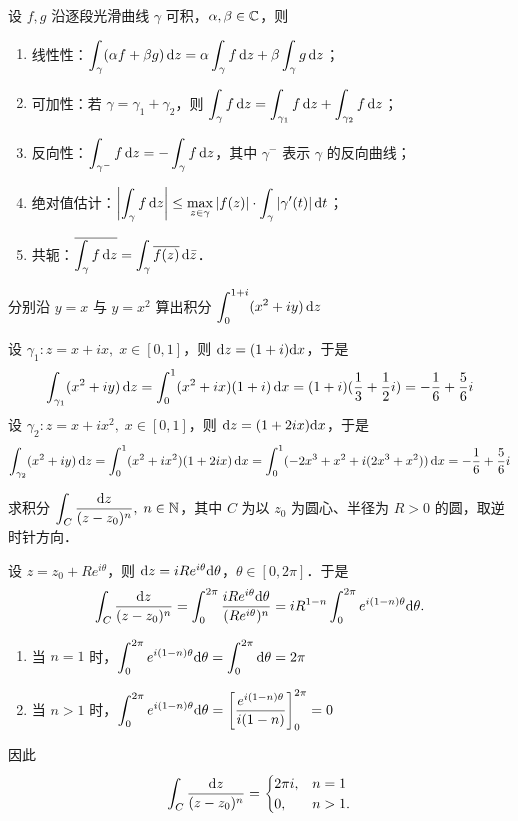 \documentclass[12pt, a4paper, oneside, UTF8]{ctexbook}
\begin{document}
\begin{theorem}[积分基本性质]
设 $f,g$ 沿逐段光滑曲线 $\gamma$ 可积，$\alpha,\beta\in\mathbb{C}$，则
\begin{enumerate}
    \item 线性性：$\displaystyle\int_\gamma (\alpha f + \beta g)\,\mathrm{d} z = \alpha\int_\gamma f\,\mathrm{d} z + \beta\int_\gamma g\,\mathrm{d} z$；
    \item 可加性：若 $\gamma=\gamma_1+\gamma_2$，则 $\displaystyle\int_\gamma f\,\mathrm{d} z = \int_{\gamma_1}f\,\mathrm{d} z + \int_{\gamma_2}f\,\mathrm{d} z$；
    \item 反向性：$\displaystyle\int_{\gamma^-} f\,\mathrm{d} z = -\int_\gamma f\,\mathrm{d} z$，其中 $\gamma^-$ 表示 $\gamma$ 的反向曲线；
    \item 绝对值估计：$\displaystyle\abs{\int_\gamma f\,\mathrm{d} z} \le \max_{z\in\gamma}\abs{f(z)}\cdot \int_{\gamma} \abs{\gamma'(t)}\,\mathrm{d} t$；
    \item 共轭：$\displaystyle\overline{\int_\gamma f\,\mathrm{d} z} = \int_\gamma \overline{f(z)}\,\mathrm{d}\bar z$．
\end{enumerate}
\end{theorem}
\begin{example}
    分别沿 $y=x$ 与 $y=x^2$ 算出积分 $\displaystyle\int_0^{1+i}(x^2+iy)\,\mathrm{d} z$
\end{example}
\begin{solution}
    
    设 $\gamma_1\colon z=x+ix,\;x\in[0,1]$，则 $\mathrm{d} z = (1+i)\mathrm{d} x$，于是
    \[
    \int_{\gamma_1}(x^2+iy)\,\mathrm{d} z = \int_0^1(x^2+ix)(1+i)\,\mathrm{d} x = (1+i)(\frac{1}{3}+\frac{1}{2}i) = -\frac{1}{6}+\frac{5}{6}i
    \]
    设 $\gamma_2\colon z=x+ix^2,\;x\in[0,1]$，则 $\mathrm{d} z = (1+2ix)\mathrm{d} x$，于是
    \[
    \int_{\gamma_2}(x^2+iy)\,\mathrm{d} z = \int_0^1(x^2+ix^2)(1+2ix)\,\mathrm{d} x = \int_0^1(-2x^3+x^2+i(2x^3+x^2))\,\mathrm{d} x=-\frac16+\frac56i 
    \]
\end{solution}
\begin{example}
    求积分 $\displaystyle\int_C\frac{\mathrm{d} z}{(z-z_0)^n},\;n\in \mathbb{N}$，其中 $C$ 为以 $z_0$ 为圆心、半径为 $R>0$ 的圆，取逆时针方向．
\end{example}
\begin{solution}

    设 $z = z_0 + Re^{i\theta}$，则 $\mathrm{d} z = iRe^{i\theta}\mathrm{d}\theta$，$\theta\in[0,2\pi]$．于是
    \[
    \int_C\frac{\mathrm{d} z}{(z-z_0)^n} = \int_0^{2\pi}\frac{iRe^{i\theta}\mathrm{d}\theta}{(Re^{i\theta})^n} = iR^{1-n}\int_0^{2\pi}e^{i(1-n)\theta}\mathrm{d}\theta.
    \]
    \begin{enumerate}
        \item 当 $n=1$ 时，$\displaystyle\int_0^{2\pi}e^{i(1-n)\theta}\mathrm{d}\theta = \int_0^{2\pi}\mathrm{d}\theta = 2\pi$
        \item 当 $n>1$ 时，$\displaystyle\int_0^{2\pi}e^{i(1-n)\theta}\mathrm{d}\theta = \left[\frac{e^{i(1-n)\theta}}{i(1-n)}\right]_0^{2\pi} = 0$
    \end{enumerate}

    因此
    \[
    \int_C\frac{\mathrm{d} z}{(z-z_0)^n} =
    \begin{cases}
        2\pi i, & n=1\\
        0, & n>1.
    \end{cases}
    \]
\end{solution}
\end{document}
